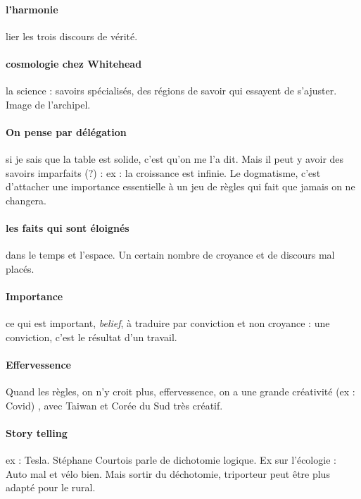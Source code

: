 \paragraph{l'harmonie} lier les trois discours de vérité. 

\paragraph{cosmologie chez Whitehead} la science  : savoirs spécialisés, des régions de savoir qui essayent de s'ajuster. Image de l'archipel. 

\paragraph{On pense par délégation} si je sais que la table est solide, c'est qu'on me l'a dit.
Mais il peut y avoir des savoirs imparfaits (?) : ex : la croissance est infinie.
Le dogmatisme, c'est d'attacher une importance essentielle à un jeu de règles qui fait que jamais on ne changera. 

\paragraph{les faits qui sont éloignés } dans le temps et l'espace.  Un certain nombre de croyance et de discours mal placés.

\paragraph{Importance} ce qui est important, \textit{belief}, à traduire par conviction et non croyance : une conviction, c'est le résultat d'un travail. 

\paragraph{Effervessence}  Quand les règles, on n'y croit plus,  effervessence, on a une grande créativité (ex : Covid) , avec Taiwan et Corée du Sud très créatif.

\paragraph{Story telling} ex : Tesla. Stéphane Courtois parle de dichotomie logique. Ex sur l'écologie : Auto mal et vélo bien. Mais sortir du déchotomie, triporteur peut être plus adapté pour le rural.








